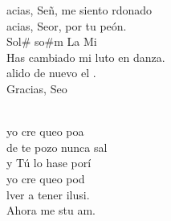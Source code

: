 \begin{cancion}%
	\begin{chorus}%
	acias, Señ, me siento rdonado\\
	acias, Seor, por tu peón.\\
Sol#     so#m   La       Mi\\
Has cambiado mi luto en danza.\\
	alido de nuevo el .\\
	Gracias, Seo  \\
	\end{chorus}%
	\jump\\
	yo cre queo poa\\
	de te pozo nunca sal\\
	y Tú lo hase porí\\
	yo cre queo pod\\
	lver a tener ilusi.\\
	Ahora me stu am. \\
\end{cancion}%
